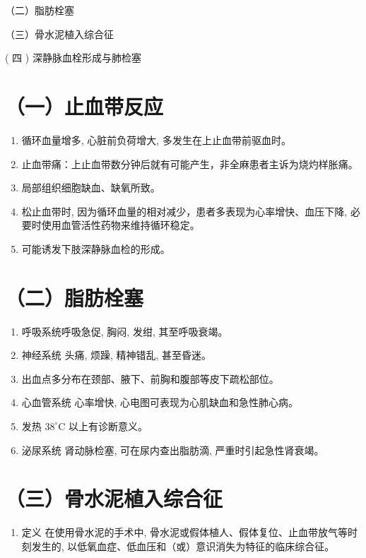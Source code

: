 \documentclass[10pt]{article}
\begin{document}
（二）脂肪栓塞

（三）骨水泥植入综合征

( 四 ) 深静脉血栓形成与肺检塞

\section*{（一）止血带反应}
\begin{enumerate}
  \item 循环血量增多, 心脏前负荷增大, 多发生在上止血带前驱血时。

  \item 止血带痛：上止血带数分钟后就有可能产生，非全麻患者主诉为烧灼样胀痛。

  \item 局部组织细胞缺血、缺氧所致。

  \item 松止血带时, 因为循环血量的相对减少，患者多表现为心率增快、血压下降, 必要时使用血管活性药物来维持循环稳定。

  \item 可能诱发下肢深静脉血检的形成。

\end{enumerate}

\section*{（二）脂肪栓塞}
\begin{enumerate}
  \item 呼吸系统呼吸急促, 胸闷, 发绀, 其至呼吸衰竭。

  \item 神经系统 头痛, 烦躁, 精神错乱, 甚至昏迷。

  \item 出血点多分布在颈部、腋下、前胸和腹部等皮下疏松部位。

  \item 心血管系统 心率增快, 心电图可表现为心肌缺血和急性肺心病。

  \item 发热 $38^{\circ} \mathrm{C}$ 以上有诊断意义。

  \item 泌尿系统 肾动脉检塞, 可在尿内查出脂肪滴, 严重时引起急性肾衰竭。

\end{enumerate}

\section*{（三）骨水泥植入综合征}
\begin{enumerate}
  \item 定义 在使用骨水泥的手术中, 骨水泥或假体植人、假体复位、止血带放气等时刻发生的, 以低氧血症、低血压和（或）意识消失为特征的临床综合征。
\end{enumerate}
\end{document}
